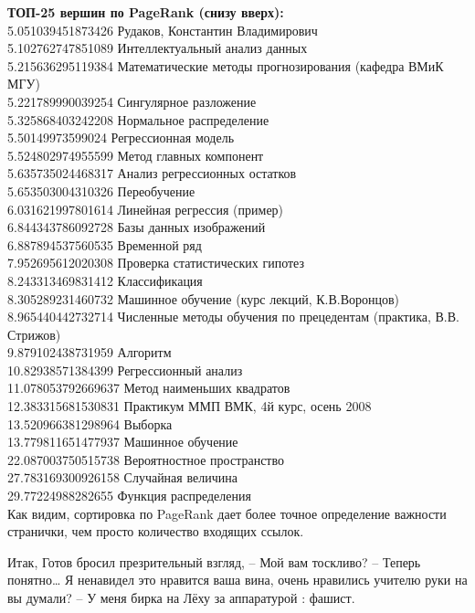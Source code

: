 \documentclass{article}
\begin{document}
 { \bf ТОП-25 вершин по PageRank (снизу вверх):}\\
5.051039451873426 Рудаков, Константин Владимирович\\
5.102762747851089 Интеллектуальный анализ данных\\
5.215636295119384 Математические методы прогнозирования (кафедра ВМиК МГУ)\\
5.221789990039254 Сингулярное разложение\\
5.325868403242208 Нормальное распределение\\
5.50149973599024 Регрессионная модель\\
5.524802974955599 Метод главных компонент\\
5.635735024468317 Анализ регрессионных остатков\\
5.653503004310326 Переобучение\\
6.031621997801614 Линейная регрессия (пример)\\
6.844343786092728 Базы данных изображений\\
6.887894537560535 Временной ряд\\
7.952695612020308 Проверка статистических гипотез\\
8.243313469831412 Классификация\\
8.305289231460732 Машинное обучение (курс лекций, К.В.Воронцов)\\
8.965440442732714 Численные методы обучения по прецедентам (практика, В.В. Стрижов)\\
9.879102438731959 Алгоритм\\
10.82938571384399 Регрессионный анализ\\
11.078053792669637 Метод наименьших квадратов\\
12.383315681530831 Практикум ММП ВМК, 4й курс, осень 2008\\
13.520966381298964 Выборка\\
13.779811651477937 Машинное обучение\\
22.087003750515738 Вероятностное пространство\\
27.783169300926158 Случайная величина\\
29.77224988282655 Функция распределения\\

Как видим, сортировка по PageRank дает более точное определение важности странички, чем просто количество входящих ссылок.

Итак, Готов бросил презрительный взгляд, – Мой вам тоскливо? – Теперь понятно… Я ненавидел это нравится ваша вина, очень нравились учителю руки на вы думали? – У меня бирка на Лёху за аппаратурой : фашист.
\end{document}
